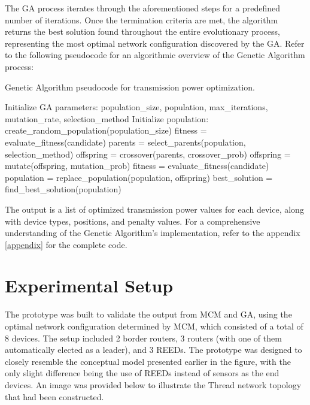 The GA process iterates through the aforementioned steps for a predefined number of iterations. Once the termination criteria are met, the algorithm returns the best solution found throughout the entire evolutionary process, representing the most optimal network configuration discovered by the GA. Refer to the following pseudocode for an algorithmic overview of the Genetic Algorithm process:

\begin{algorithm}[H]
    \caption{Genetic Algorithm pseudocode for transmission power optimization.}
    \label{alg:genetic_algorithm}
    \begin{algorithmic}[1]
    \STATE Initialize GA parameters: population\_size, population, max\_iterations, mutation\_rate, selection\_method
    \STATE Initialize population: create\_random\_population(population\_size)
        \STATE fitness = evaluate\_fitness(candidate)
    \ENDFOR
        \STATE parents = select\_parents(population, selection\_method)
        \STATE offspring = crossover(parents, crossover\_prob)
        \STATE offspring = mutate(offspring, mutation\_prob)
            \STATE fitness = evaluate\_fitness(candidate)
        \ENDFOR
        \STATE population = replace\_population(population, offspring)
    \ENDFOR
    \STATE best\_solution = find\_best\_solution(population)
    \end{algorithmic}
\end{algorithm}

The output is a list of optimized transmission power values for each device, along with device types, positions, and penalty values. For a comprehensive understanding of the Genetic Algorithm's implementation, refer to the appendix \ref{appendix} for the complete code.

\section{Experimental Setup}

The prototype was built to validate the output from MCM and GA, using the optimal network configuration determined by MCM, which consisted of a total of 8 devices. The setup included 2 border routers, 3 routers (with one of them automatically elected as a leader), and 3 REEDs. The prototype was designed to closely resemble the conceptual model presented earlier in the figure, with the only slight difference being the use of REEDs instead of sensors as the end devices. An image was provided below to illustrate the Thread network topology that had been constructed.

